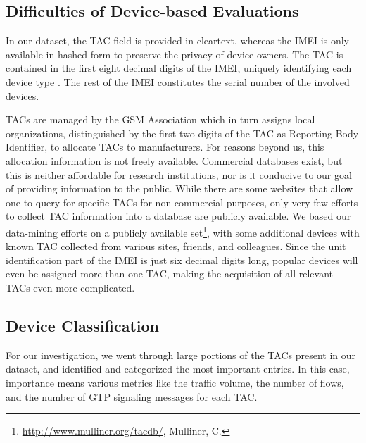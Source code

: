 \subsection{Difficulties of Device-based Evaluations}

In our dataset, the \gls{TAC} field is provided in clear\-text, whereas the \gls{IMEI} is only available in hashed form to preserve the privacy of device owners. The \gls{TAC} is contained in the first eight decimal digits of the \gls{IMEI}, uniquely identifying each device type \cite{3gpp23.003}. The rest of the \gls{IMEI} constitutes the serial number of the involved devices.

\glspl{TAC} are managed by the GSM Association which in turn assigns local organizations, distinguished by the first two digits of the \gls{TAC} as Reporting Body Identifier, to allocate \glspl{TAC} to manufacturers. For reasons beyond us, this allocation information is not freely available. Commercial databases exist, but this is neither affordable for research institutions, nor is it conducive to our goal of providing information to the public. While there are some websites that allow one to query for specific \glspl{TAC} for non-commercial purposes, only very few efforts to collect \gls{TAC} information into a database are publicly available. We based our data-mining efforts on a publicly available set\footnote{\url{http://www.mulliner.org/tacdb/}, Mulliner, C.}, with some additional devices with known \gls{TAC} collected from various sites, friends, and colleagues. Since the unit identification part of the \gls{IMEI} is just six decimal digits long, popular devices will even be assigned more than one TAC, making the acquisition of all relevant \glspl{TAC} even more complicated.



\subsection{Device Classification}

For our investigation, we went through large portions of the \glspl{TAC} present in our dataset, and identified and categorized the most important entries. In this case, importance means various metrics like the traffic volume, the number of flows, and the number of \gls{GTP} signaling messages for each \gls{TAC}. 

